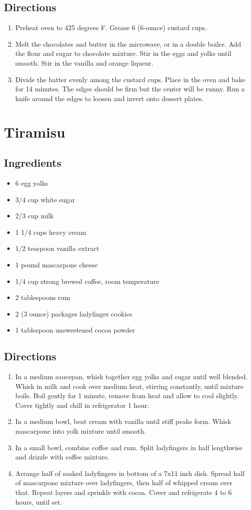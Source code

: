 \documentclass[oneside,11pt]{book}
\newcommand{\Ingredients}[1]{
    \subsection*{Ingredients}
    \begin{itemize} 
      #1 
    \end{itemize}
}
\newcommand{\Directions}[1]{
    \subsection*{Directions}
    \begin{enumerate} 
      #1 
    \end{enumerate}
}
\newcommand{\recipe}[1]{
    \section*{ \hspace{-12pt} #1 }
    \addcontentsline{toc}{section}{ \hspace{-6pt} #1 }
}
\begin{document}
        \Directions{
            \item Preheat oven to 425 degrees F. Grease 6 (6-ounce) custard cups. 
            \item Melt the chocolates and butter in the microwave, or in a double boiler. 
                Add the flour and sugar to chocolate mixture. Stir in the eggs and yolks until smooth. 
                Stir in the vanilla and orange liqueur. 
            \item Divide the batter evenly among the custard cups. 
                Place in the oven and bake for 14 minutes. 
                The edges should be firm but the center will be runny. 
                Run a knife around the edges to loosen and invert onto dessert plates.
        }
  
    \recipe{Tiramisu}
        \Ingredients{
            \item 6 egg yolks 
            \item 3/4 cup white sugar 
            \item 2/3 cup milk 
            \item 1 1/4 cups heavy cream 
            \item 1/2 teaspoon vanilla extract 
            \item 1 pound mascarpone cheese 
            \item 1/4 cup strong brewed coffee, room temperature
            \item 2 tablespoons rum 
            \item 2 (3 ounce) packages ladyfinger cookies 
            \item 1 tablespoon unsweetened cocoa powder
        }
        
        \Directions{
            \item In a medium saucepan, whisk together egg yolks and sugar until well blended. 
                Whisk in milk and cook over medium heat, stirring constantly, until mixture boils. 
                Boil gently for 1 minute, remove from heat and allow to cool slightly. 
                Cover tightly and chill in refrigerator 1 hour.
            \item In a medium bowl, beat cream with vanilla until stiff peaks form. 
                Whisk mascarpone into yolk mixture until smooth.
            \item In a small bowl, combine coffee and rum. 
                Split ladyfingers in half lengthwise and drizzle with coffee mixture.
            \item Arrange half of soaked ladyfingers in bottom of a 7x11 inch dish. 
                Spread half of mascarpone mixture over ladyfingers, then half of whipped cream over that. 
                Repeat layers and sprinkle with cocoa. Cover and refrigerate 4 to 6 hours, until set.
        }
\end{document}
